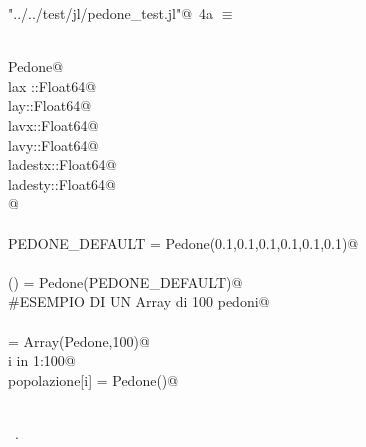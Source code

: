 \documentclass[]{article}
\begin{document}
\begin{flushleft} \small
\begin{minipage}{\linewidth} \label{scrap6}
\protect{}\verb@"../../test/jl/pedone_test.jl"@\nobreak\ {\footnotesize 4a }$\equiv$
\vspace{-1ex}
\begin{list}{}{} \item
\mbox{}\verb@@\\
\mbox{}\verb@type Pedone@\\
\mbox{}\verb@      lax ::Float64@\\
\mbox{}\verb@      lay::Float64@\\
\mbox{}\verb@      lavx::Float64@\\
\mbox{}\verb@      lavy::Float64@\\
\mbox{}\verb@      ladestx::Float64@\\
\mbox{}\verb@      ladesty::Float64@\\
\mbox{}\verb@      @\\
\mbox{}\verb@end@\\
\mbox{}\verb@const PEDONE_DEFAULT = Pedone(0.1,0.1,0.1,0.1,0.1,0.1)@\\
\mbox{}\verb@@\\
\mbox{}\verb@Pedone() = Pedone(PEDONE_DEFAULT)@\\
\mbox{}\verb@\#ESEMPIO DI UN Array di 100 pedoni@\\
\mbox{}\verb@@\\
\mbox{}\verb@popolazione = Array(Pedone,100)@\\
\mbox{}\verb@for i in 1:100@\\
\mbox{}\verb@   popolazione[i] = Pedone()@\\
\mbox{}\verb@end@\\
\mbox{}\verb@@{\NWsep}
\end{list}
\vspace{-1ex}
\footnotesize\addtolength{\baselineskip}{-1ex}
\begin{list}{}{\setlength{\itemsep}{-\parsep}\setlength{\itemindent}{-\leftmargin}}
\item \NWtxtFileDefBy\ .
\end{list}
\end{minipage}\\[4ex]
\end{flushleft}
\end{document}
